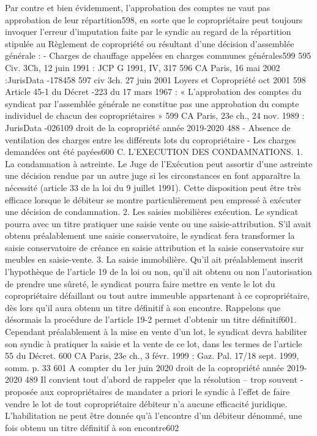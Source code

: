 Par contre et bien évidemment, l’approbation des comptes ne vaut pas approbation de leur répartition598, en sorte que le copropriétaire peut toujours invoquer l’erreur d’imputation faite par le syndic au regard de la répartition stipulée au Règlement de copropriété ou résultant d’une décision d’assemblée générale :
- Charges de chauffage appelées en charges communes générales599
595 Civ. 3\degres Ch, 12 juin 1991 : JCP G 1991, IV, 317
596 CA Paris, 16 mai 2002 :JurisData -178458
597 civ 3\degres ch. 27 juin 2001 Loyers et Copropriété oct 2001 
598 Article 45-1 du Décret -223 du 17 mars 1967 : « L'approbation des comptes du syndicat par l'assemblée générale ne constitue pas une approbation du compte individuel de chacun des copropriétaires »
599 CA Paris, 23e ch., 24 nov. 1989 : JurisData -026109
droit de la copropriété année 2019-2020
488
- Absence de ventilation des charges entre les différents lots du copropriétaire
- Les charges demandées ont été payées600
C. L'EXECUTION DES CONDAMNATIONS.
1. La condamnation à astreinte.
Le Juge de l'Exécution peut assortir d'une astreinte une décision rendue par un autre juge si les circonstances en font apparaître la nécessité (article 33 de la loi du 9 juillet 1991).
Cette disposition peut être très efficace lorsque le débiteur se montre particulièrement peu empressé à exécuter une décision de condamnation.
2. Les saisies mobilières exécution.
Le syndicat pourra avec un titre pratiquer une saisie vente ou une saisie-attribution.
S'il avait obtenu préalablement une saisie conservatoire, le syndicat fera transformer la saisie conservatoire de créance en saisie attribution et la saisie conservatoire sur meubles en saisie-vente.
3. La saisie immobilière.
Qu'il ait préalablement inscrit l'hypothèque de l'article 19 de la loi ou non, qu'il ait obtenu ou non l'autorisation de prendre une sûreté, le syndicat pourra faire mettre en vente le lot du copropriétaire défaillant ou tout autre immeuble appartenant à ce copropriétaire, dès lors qu'il aura obtenu un titre définitif à son encontre.
Rappelons que désormais la procédure de l’article 19-2 permet d’obtenir un titre définitif601.
Cependant préalablement à la mise en vente d'un lot, le syndicat devra habiliter son syndic à pratiquer la saisie et la vente de ce lot, dans les termes de l'article 55 du Décret.
600 CA Paris, 23e ch., 3 févr. 1999 : Gaz. Pal. 17/18 sept. 1999, somm. p. 33
601 A compter du 1er juin 2020
droit de la copropriété année 2019-2020
489
Il convient tout d’abord de rappeler que la résolution – trop souvent - proposée aux copropriétaires de mandater a priori le syndic à l’effet de faire vendre le lot de tout copropriétaire débiteur n’a aucune efficacité juridique. L’habilitation ne peut être donnée qu’à l’encontre d’un débiteur dénommé, une fois obtenu un titre définitif à son encontre602
